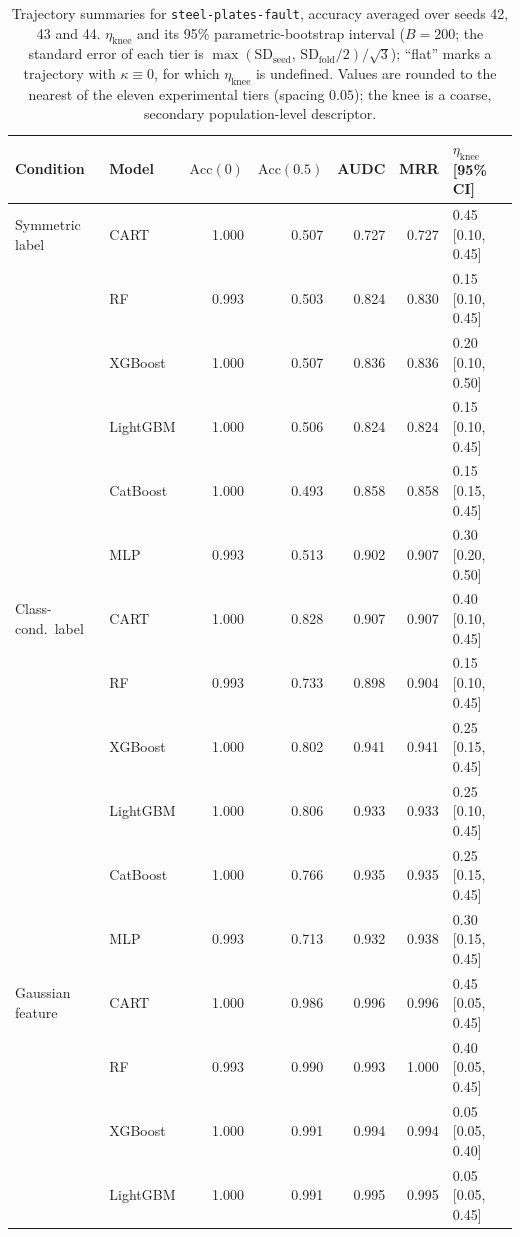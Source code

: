 \documentclass[pdflatex,sn-mathphys]{sn-jnl}
\theoremstyle{thmstyleone}
\begin{document}
\begin{table}[htbp]
\centering
\scriptsize
\setlength{\tabcolsep}{3.5pt}
\caption{Trajectory summaries for \texttt{steel-plates-fault}, accuracy averaged over seeds 42, 43 and 44. $\eta_{\mathrm{knee}}$ and its 95\% parametric-bootstrap interval ($B=200$; the standard error of each tier is $\max(\mathrm{SD}_{\mathrm{seed}},\,\mathrm{SD}_{\mathrm{fold}}/2)/\sqrt3$); ``flat'' marks a trajectory with $\kappa\equiv 0$, for which $\eta_{\mathrm{knee}}$ is undefined. Values are rounded to the nearest of the eleven experimental tiers (spacing $0.05$); the knee is a coarse, secondary population-level descriptor.}
\label{tab:traj_steel_plates_fault}
\begin{tabular}{@{}llrrrrl@{}}
\toprule
Condition & Model & $\mathrm{Acc}(0)$ & $\mathrm{Acc}(0.5)$ & AUDC & MRR & $\eta_{\mathrm{knee}}$ [95\% CI] \\
\midrule
Symmetric label & CART & 1.000 & 0.507 & 0.727 & 0.727 & 0.45 [0.10, 0.45] \\
 & RF & 0.993 & 0.503 & 0.824 & 0.830 & 0.15 [0.10, 0.45] \\
 & XGBoost & 1.000 & 0.507 & 0.836 & 0.836 & 0.20 [0.10, 0.50] \\
 & LightGBM & 1.000 & 0.506 & 0.824 & 0.824 & 0.15 [0.10, 0.45] \\
 & CatBoost & 1.000 & 0.493 & 0.858 & 0.858 & 0.15 [0.15, 0.45] \\
 & MLP & 0.993 & 0.513 & 0.902 & 0.907 & 0.30 [0.20, 0.50] \\
\midrule
Class-cond.\ label & CART & 1.000 & 0.828 & 0.907 & 0.907 & 0.40 [0.10, 0.45] \\
 & RF & 0.993 & 0.733 & 0.898 & 0.904 & 0.15 [0.10, 0.45] \\
 & XGBoost & 1.000 & 0.802 & 0.941 & 0.941 & 0.25 [0.15, 0.45] \\
 & LightGBM & 1.000 & 0.806 & 0.933 & 0.933 & 0.25 [0.10, 0.45] \\
 & CatBoost & 1.000 & 0.766 & 0.935 & 0.935 & 0.25 [0.15, 0.45] \\
 & MLP & 0.993 & 0.713 & 0.932 & 0.938 & 0.30 [0.15, 0.45] \\
\midrule
Gaussian feature & CART & 1.000 & 0.986 & 0.996 & 0.996 & 0.45 [0.05, 0.45] \\
 & RF & 0.993 & 0.990 & 0.993 & 1.000 & 0.40 [0.05, 0.45] \\
 & XGBoost & 1.000 & 0.991 & 0.994 & 0.994 & 0.05 [0.05, 0.40] \\
 & LightGBM & 1.000 & 0.991 & 0.995 & 0.995 & 0.05 [0.05, 0.45] \\

\end{tabular}
\end{table}
\end{document}
